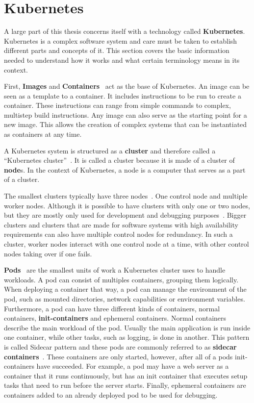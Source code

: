 \section{Kubernetes}\label{sec:kubernetes}

A large part of this thesis concerns itself with a technology called \textbf{Kubernetes}.
Kubernetes is a complex software system and care must be taken to establish different parts and concepts of it.
This section covers the basic information needed to understand how it works and what certain terminology means in its context.

First, \textbf{Images} and \textbf{Containers}~\cite{docker-image,kubernetes-images,kubernetes-containers} act as the base of Kubernetes.
An image can be seen as a template to a container.
It includes instructions to be run to create a container.
These instructions can range from simple commands to complex, multistep build instructions.
Any image can also serve as the starting point for a new image.
This allows the creation of complex systems that can be instantiated as containers at any time.

A Kubernetes system is structured as a \textbf{cluster} and therefore called a ``Kubernetes cluster''~\cite{kubernetes-cluster}.
It is called a cluster because it is made of a cluster of \textbf{node}s.
In the context of Kubernetes, a node is a computer that serves as a part of a cluster.

The smallest clusters typically have three nodes~\cite{kubernetes-cluster}.
One control node and multiple worker nodes.
Although it is possible to have clusters with only one or two nodes, but they are mostly only used for development and debugging purposes~\cite{minikube}.
Bigger clusters and clusters that are made for software systems with high availability requirements can also have multiple control nodes for redundancy.
In such a cluster, worker nodes interact with one control node at a time, with other control nodes taking over if one fails.

\textbf{Pods}~\cite{kubernetes-pods} are the smallest units of work a Kubernetes cluster uses to handle workloads.
A pod can consist of multiples containers, grouping them logically.
When deploying a container that way, a pod can manage the environment of the pod, such as mounted directories, network capabilities or environment variables.
Furthermore, a pod can have three different kinds of containers, normal containers, \textbf{init-containers} and ephemeral containers.
Normal containers describe the main workload of the pod.
Usually the main application is run inside one container, while other tasks, such as logging, is done in another.
This pattern is called Sidecar pattern and these pods are commonly referred to as \textbf{sidecar containers}~\cite{sidecar-container}.
These containers are only started, however, after all of a pods init-containers have succeeded.
For example, a pod may have a web server as a container that it runs continuously, but has an init container that executes setup tasks that need to run before the server starts.
Finally, ephemeral containers are containers added to an already deployed pod to be used for debugging.

